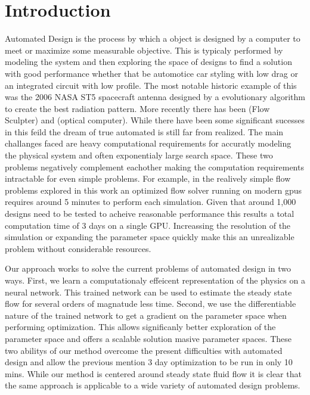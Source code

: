 \documentclass{article} %
\begin{document}
\section{Introduction}

Automated Design is the process by which a object is designed by a computer to meet or maximize some measurable objective. This is typicaly performed by modeling the system and then exploring the space of designs to find a solution with good performance whether that be automotice car styling with low drag or an integrated circuit with low profile. The most notable historic example of this was the 2006 NASA ST5 spacecraft antenna designed by a evolutionary algorithm to create the best radiation pattern. More recently there has been (Flow Sculpter) and (optical computer). While there have been some significant sucesses in this feild the dream of true automated is still far from realized. The main challanges faced are heavy computational requirements for accuratly modeling the physical system and often exponentialy large search space. These two problems negatively complement eachother making the computation requirements intractable for even simple problems. For example, in the realively simple flow problems explored in this work an optimized flow solver running on modern gpus requires around 5 minutes to perform each simulation. Given that around 1,000 designs need to be tested to acheive reasonable performance this results a total computation time of 3 days on a single GPU. Increassing the resolution of the simulation or expanding the parameter space quickly make this an unrealizable problem without considerable resources.

Our approach works to solve the current problems of automated design in two ways. First, we learn a computationaly effeicent representation of the physics on a neural network. This trained network can be used to estimate the steady state flow for several orders of magnatude less time. Second, we use the differentiable nature of the trained network to get a gradient on the parameter space when performing optimization. This allows significanly better exploration of the parameter space and offers a scalable solution masive parameter spaces. These two abilitys of our method overcome the present difficulties with automated design and allow the previous mention 3 day optimization to be run in only 10 mins. While our method is centered around steady state fluid flow it is clear that the same approach is applicable to a wide variety of automated design problems.
\end{document}
